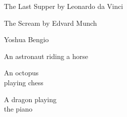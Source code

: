 \begin{figure*}[t]
\centering
\footnotesize
    \begin{minipage}[t]{.025\textwidth}
         \vspace{0pt}
    \end{minipage}%
    \hspace{1ex}%
    \begin{minipage}[t]{.98\textwidth}
        \vspace{0pt}
            \begin{minipage}[t]{0.166\textwidth}
                \centering
                The Last Supper by Leonardo da Vinci
            \end{minipage}%
            \begin{minipage}[t]{0.166\textwidth}
                \centering
                The Scream by Edvard Munch
            \end{minipage}%
            \begin{minipage}[t]{0.166\textwidth}
                \centering
                Yoshua Bengio
            \end{minipage}%
            \begin{minipage}[t]{0.166\textwidth}
                \centering
                An astronaut riding a horse
            \end{minipage}%
            \begin{minipage}[t]{0.166\textwidth}
                \centering
                An octopus\\playing chess
            \end{minipage}%
            \begin{minipage}[t]{0.166\textwidth}
                \centering
                A dragon playing\\the piano
            \end{minipage}%
    \end{minipage}


\end{figure*}
